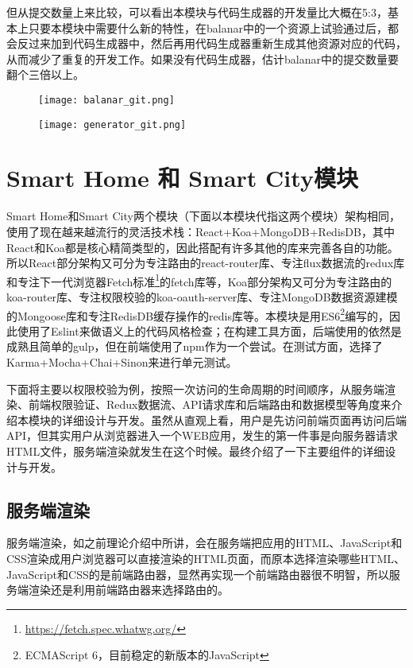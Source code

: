 但从提交数量上来比较，可以看出本模块与代码生成器的开发量比大概在5:3，基本上只要本模块中需要什么新的特性，在balanar中的一个资源上试验通过后，都会反过来加到代码生成器中，然后再用代码生成器重新生成其他资源对应的代码，从而减少了重复的开发工作。如果没有代码生成器，估计balanar中的提交数量要翻个三倍以上。
\begin{figure}[H]
 \centering
 \texttt{[image: balanar\_git.png]}

 \vspace{0.5cm}

 \texttt{[image: generator\_git.png]}
\end{figure}

\section{Smart Home 和 Smart City模块}
Smart Home和Smart City两个模块（下面以本模块代指这两个模块）架构相同，使用了现在越来越流行的灵活技术栈：React+Koa+MongoDB+RedisDB，其中React和Koa都是核心精简类型的，因此搭配有许多其他的库来完善各自的功能。所以React部分架构又可分为专注路由的react-router库、专注flux数据流的redux库和专注下一代浏览器Fetch标准\footnote{\url{https://fetch.spec.whatwg.org/}}的fetch库等，Koa部分架构又可分为专注路由的koa-router库、专注权限校验的koa-oauth-server库、专注MongoDB数据资源建模的Mongoose库和专注RedisDB缓存操作的redis库等。本模块是用ES6\footnote{ECMAScript 6，目前稳定的新版本的JavaScript}编写的，因此使用了Eslint来做语义上的代码风格检查；在构建工具方面，后端使用的依然是成熟且简单的gulp，但在前端使用了npm作为一个尝试。在测试方面，选择了Karma+Mocha+Chai+Sinon来进行单元测试。

下面将主要以权限校验为例，按照一次访问的生命周期的时间顺序，从服务端渲染、前端权限验证、Redux数据流、API请求库和后端路由和数据模型等角度来介绍本模块的详细设计与开发。虽然从直观上看，用户是先访问前端页面再访问后端API，但其实用户从浏览器进入一个WEB应用，发生的第一件事是向服务器请求HTML文件，服务端渲染就发生在这个时候。最终介绍了一下主要组件的详细设计与开发。
\subsection{服务端渲染}
服务端渲染，如之前理论介绍中所讲，会在服务端把应用的HTML、JavaScript和CSS渲染成用户浏览器可以直接渲染的HTML页面，而原本选择渲染哪些HTML、JavaScript和CSS的是前端路由器，显然再实现一个前端路由器很不明智，所以服务端渲染还是利用前端路由器来选择路由的。

